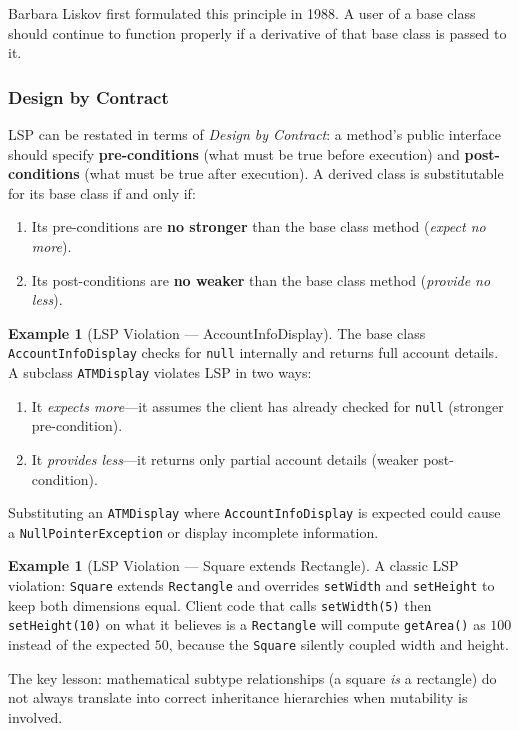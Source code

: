 \documentclass[11pt, a4paper, notitlepage]{report}
\theoremstyle{definition}
\theoremstyle{remark}
\theoremstyle{definition}
\newtheorem{example}[theorem]{Example}
\begin{document}
Barbara Liskov first formulated this principle in 1988. A user of a base class should
continue to function properly if a derivative of that base class is passed to it.

\subsubsection{Design by Contract}

LSP can be restated in terms of \emph{Design by Contract}: a method's public interface
should specify \textbf{pre-conditions} (what must be true before execution) and
\textbf{post-conditions} (what must be true after execution). A derived class is
substitutable for its base class if and only if:

\begin{enumerate}[label=\alph*)]
  \item Its pre-conditions are \textbf{no stronger} than the base class method
        (\emph{expect no more}).
  \item Its post-conditions are \textbf{no weaker} than the base class method
        (\emph{provide no less}).
\end{enumerate}

\begin{example}[LSP Violation --- AccountInfoDisplay]
\label{ex:ch9-lsp-violation}
The base class \texttt{AccountInfoDisplay} checks for \texttt{null} internally and returns
full account details. A subclass \texttt{ATMDisplay} violates LSP in two ways:
\begin{enumerate}
  \item It \emph{expects more}---it assumes the client has already checked for \texttt{null}
        (stronger pre-condition).
  \item It \emph{provides less}---it returns only partial account details
        (weaker post-condition).
\end{enumerate}
Substituting an \texttt{ATMDisplay} where \texttt{AccountInfoDisplay} is expected could
cause a \texttt{NullPointerException} or display incomplete information.
\end{example}

\begin{example}[LSP Violation --- Square extends Rectangle]
\label{ex:ch9-lsp-square}
A classic LSP violation: \texttt{Square} extends \texttt{Rectangle} and overrides
\texttt{setWidth} and \texttt{setHeight} to keep both dimensions equal. Client code that
calls \texttt{setWidth(5)} then \texttt{setHeight(10)} on what it believes is a
\texttt{Rectangle} will compute \texttt{getArea()} as $100$ instead of the expected $50$,
because the \texttt{Square} silently coupled width and height.

The key lesson: mathematical subtype relationships (a square \emph{is} a rectangle) do
not always translate into correct inheritance hierarchies when mutability is involved.
\end{example}
\end{document}
